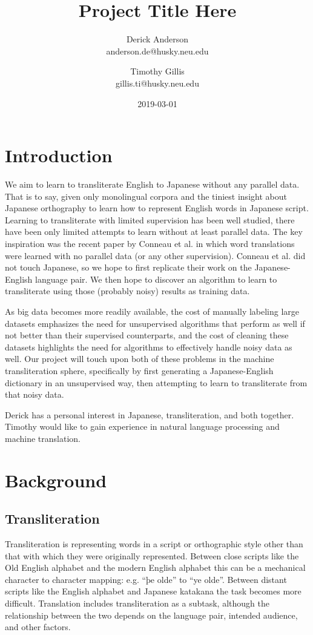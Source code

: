 \documentclass{article}
\title{Project Title Here}
\date{2019-03-01}
\author{Derick Anderson \\ anderson.de@husky.neu.edu
  \and Timothy Gillis \\ gillis.ti@husky.neu.edu }
\begin{document}
\maketitle

\section*{Introduction}

We aim to learn to transliterate English to Japanese
without any parallel data.
That is to say,
given only monolingual corpora
and the tiniest insight about Japanese orthography
to learn how to represent English words in Japanese script.
Learning to transliterate with limited supervision has been well studied,
there have been only limited attempts to learn without at least parallel data.
The key inspiration was the recent paper by
Conneau et al. \cite{Conneau2018WordTW}
in which word translations were learned with no parallel data
(or any other supervision).
Conneau et al. did not touch Japanese,
so we hope to first replicate their work on the Japanese-English language pair.
We then hope to discover an algorithm to learn to transliterate
using those (probably noisy) results as training data.

As big data becomes more readily available, the cost of manually labeling large
datasets emphasizes the need for unsupervised algorithms that perform as well if
not better than their supervised counterparts, and the cost of cleaning these
datasets highlights the need for algorithms to effectively handle noisy data as well.
Our project will touch upon both of these problems in the machine transliteration
sphere, specifically by first generating a Japanese-English dictionary in an
unsupervised way, then attempting to learn to transliterate from that noisy data.

Derick has a personal interest in Japanese, transliteration, and both together.
Timothy would like to gain experience in natural language processing and machine
translation.

\section*{Background}

\subsection*{Transliteration}

Transliteration is representing words
in a script or orthographic style
other than that with which they were originally represented.
Between close scripts like the Old English alphabet and the modern English alphabet
this can be a mechanical character to character mapping:
e.g. ``þe olde'' to ``ye olde''.
Between distant scripts
like the English alphabet and Japanese katakana
the task becomes more difficult.
Translation includes transliteration as a subtask,
although the relationship between the two
depends on the language pair, intended audience, and other factors.
\end{document}
